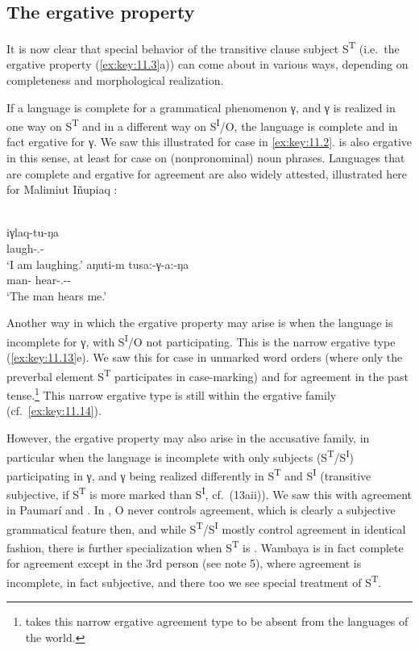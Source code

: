 \documentclass[output=paper]{langsci/langscibook}
\begin{document}
\subsection{The ergative property}\label{sec:key:11.5.1}

It is now clear that special behavior of the transitive clause subject
S\textsuperscript{T} (i.e.\ the ergative property (\ref{ex:key:11.3}a)) can come about in
various ways, depending on completeness and morphological realization.

If a language is complete for a grammatical phenomenon γ, and γ is realized in
one way on S\textsuperscript{T} and in a different way on
S\textsuperscript{I}/O, the language is complete and in fact ergative for γ. We
saw this illustrated for case in  \eqref{ex:key:11.2}.  is also ergative
in this sense, at least for case on (nonpronominal) noun phrases. Languages
that are complete and ergative for agreement are also widely attested,
illustrated here for Malimiut Iñupiaq \citep{Lanz2010}:

\ea%
    \label{ex:key:11.15} {\parencite[188]{Lanz2010}}\\
	\ea
		\gll iγlaq-tu-ŋa\\
			laugh-\Intr.\Ind-\Fsg{}\\
		\glt ‘I am laughing.’
	\ex
		\gll aŋuti-m  tusa:-γ-a:-ŋa\\
			man-\Erg{}  hear-\Tr.\Ind{}-\Tsg{}-\Fsg{}\\
		\glt ‘The man hears me.’
	\z
\z

Another way in which the ergative property may arise is when the language is
incomplete for γ, with S\textsuperscript{I}/O not participating. This is the
narrow ergative type (\ref{ex:key:11.13}e). We saw this for case in  unmarked word
orders (where only the preverbal element S\textsuperscript{T} participates in
case-marking) and for agreement in the  past
tense.\footnote{\citet[305]{Bobaljik2008} takes this narrow ergative agreement
type to be absent from the languages of the world.} This narrow ergative type
is still within the ergative family (cf.\ \eqref{ex:key:11.14}).

However, the ergative property may also arise in the accusative family, in
particular when the language is incomplete with only subjects
(S\textsuperscript{T}/S\textsuperscript{I}) participating in γ, and γ being
realized differently in S\textsuperscript{T} and S\textsuperscript{I}
(transitive subjective, if S\textsuperscript{T} is more marked than
S\textsuperscript{I}, cf.\ (13aii)). We saw this with \Tsg{} agreement in
Paumarí and . In , O never controls agreement, which is clearly a
subjective grammatical feature then, and while
S\textsuperscript{T}/S\textsuperscript{I} mostly control agreement in identical
fashion, there is further specialization when S\textsuperscript{T} is \Tsg{}.
Wambaya is in fact complete for agreement except in the 3rd person (see note
5), where agreement is incomplete, in fact subjective, and there too we see
special treatment of S\textsuperscript{T}.
\end{document}
